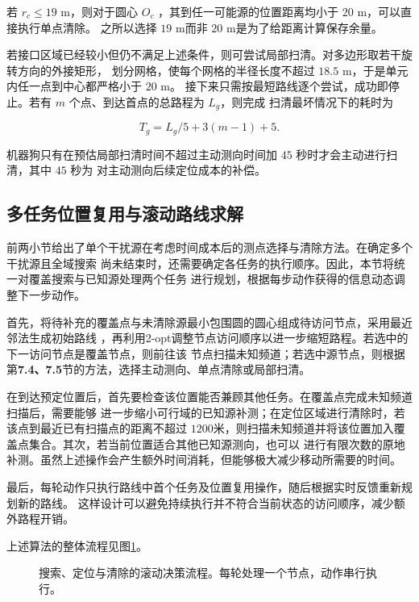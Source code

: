 \documentclass[withoutpreface,bwprint]{cumcmthesis} %
\begin{document}
若 $r_c\le19$ m，则对于圆心 $O_c$ ，其到任一可能源的位置距离均小于 $20$ m，可以直接执行单点清除。
之所以选择 $19$ m而非 $20$ m是为了给距离计算保存余量。

若接口区域已经较小但仍不满足上述条件，则可尝试局部扫清。对多边形取若干旋转方向的外接矩形，
划分网格，使每个网格的半径长度不超过 $18.5$ m，于是单元内任一点到中心都严格小于 $20$ m。
接下来只需按最短路线逐个尝试，成功即停止。若有 $m$ 个点、到达首点的总路程为 $L_g$，则完成
扫清最坏情况下的耗时为

\begin{equation}\label{eq:p3-sweep}
T_g=L_g/5+3(m-1)+5.
\end{equation}

机器狗只有在预估局部扫清时间不超过主动测向时间加 $45$ 秒时才会主动进行扫清，其中 $45$ 秒为
对主动测向后续定位成本的补偿。

\subsection{多任务位置复用与滚动路线求解}

前两小节给出了单个干扰源在考虑时间成本后的测点选择与清除方法。在确定多个干扰源且全域搜索
尚未结束时，还需要确定各任务的执行顺序。因此，本节将统一对覆盖搜索与已知源处理两个任务
进行规划，根据每步动作获得的信息动态调整下一步动作。

首先，将待补充的覆盖点与未清除源最小包围圆的圆心组成待访问节点，采用最近邻法生成初始路线
，再利用2-opt调整节点访问顺序以进一步缩短路程。若选中的下一访问节点是覆盖节点，则前往该
节点扫描未知频道；若选中源节点，则根据第\textbf{7.4、7.5}节的方法，选择主动测向、单点清除或局部扫清。

在到达预定位置后，首先要检查该位置能否兼顾其他任务。在覆盖点完成未知频道扫描后，需要能够
进一步缩小可行域的已知源补测；在定位区域进行清除时，若该点到最近已有扫描点的距离不超过
$1200$米，则扫描未知频道并将该位置加入覆盖点集合。其次，若当前位置适合其他已知源测向，也可以
进行有限次数的原地补测。虽然上述操作会产生额外时间消耗，但能够极大减少移动所需要的时间。

最后，每轮动作只执行路线中首个任务及位置复用操作，随后根据实时反馈重新规划新的路线。
这样设计可以避免持续执行并不符合当前状态的访问顺序，减少额外路程开销。

上述算法的整体流程见图\ref{fig:p3-flow}。

\begin{figure}[H]
\centering

\caption{搜索、定位与清除的滚动决策流程。每轮处理一个节点，动作串行执行。}
\label{fig:p3-flow}
\end{figure}
\end{document}
